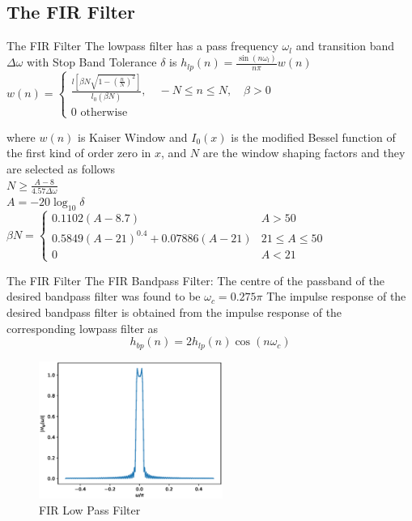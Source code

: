 \documentclass{beamer}
\begin{document}
\subsection{The FIR Filter}
\begin{frame}{The FIR Filter}
The lowpass filter has a pass frequency $\omega_{l}$ and transition band $\Delta \omega$ with Stop Band Tolerance $\delta$ is
$h_{l p}(n)=\frac{\sin \left(n \omega_{l}\right)}{n \pi} w(n)$
$w(n)=\left\{\begin{array}{l}\frac{l\left[\beta N \sqrt{1-\left(\frac{n}{N}\right)^{2}}\right]}{l_{0}(\beta N)}, \quad-N \leq n \leq N, \quad \beta>0 \\ 0 \text { otherwise }\end{array}\right.$

where $w(n)$ is Kaiser Window and $I_{0}(x)$ is the modified Bessel function of the first
kind of order zero in $x$, and $N$ are the window shaping factors and they are selected
as follows\\
$ N \geq \frac{A-8}{4.57 \Delta \omega} $\\
$ A=-20 \log _{10} \delta $\\

$\beta N=\left\{\begin{array}{ll}0.1102(A-8.7) & A>50 \\ 0.5849(A-21)^{0.4}+0.07886(A-21) & 21 \leq A \leq 50 \\ 0 & A<21\end{array}\right.$
\end{frame}

\begin{frame}{The FIR Filter}
The FIR Bandpass Filter:
The centre of the passband of the desired bandpass filter was found to be $\omega_{c}=0.275 \pi$ The impulse response of the desired bandpass filter is obtained from the
impulse response of the corresponding lowpass filter as
$$
h_{b p}(n)=2 h_{l p}(n) \cos \left(n \omega_{c}\right)
$$

\begin{figure}
    \centering
    \includegraphics[width=6cm]{figs/FIR_lowpass.eps}
    \caption{FIR Low Pass Filter}
\end{figure}
\end{frame}
\end{document}
